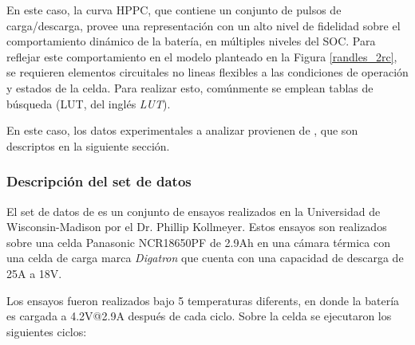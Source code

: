 \documentclass[10pt, a4paper]{article}
\begin{document}
En este caso, la curva \acrshort{HPPC}, que contiene un conjunto de pulsos de
carga/descarga, provee una representaci\'on con un alto nivel de fidelidad sobre
el comportamiento din\'amico de la bater\'ia, en m\'ultiples niveles del
\acrshort{SOC}. Para reflejar este comportamiento en el modelo planteado en la
Figura \ref{randles_2rc}, se requieren elementos circuitales no lineas flexibles
a las condiciones de operaci\'on y estados de la celda. Para realizar esto,
com\'unmente se emplean tablas de b\'usqueda (\acrshort{LUT}, del ingl\'es
\emph{\acrlong{LUT}}).

En este caso, los datos experimentales a analizar provienen de 
\cite{Kollmeyer2018}, que son descriptos en la siguiente secci\'on.

\subsubsection{Descripci\'on del set de datos}

El set de datos de  es un conjunto de ensayos realizados en 
la Universidad de Wisconsin-Madison por el Dr. Phillip Kollmeyer. Estos ensayos 
son realizados sobre una celda Panasonic NCR18650PF de 2.9Ah en una c\'amara 
t\'ermica con una celda de carga marca \emph{Digatron} que cuenta con una 
capacidad de descarga de 25A a 18V.

Los ensayos fueron realizados bajo 5 temperaturas diferents, en donde la
bater\'ia es cargada a 4.2V@2.9A despu\'es de cada ciclo. Sobre la celda se
ejecutaron los siguientes ciclos:
\end{document}
